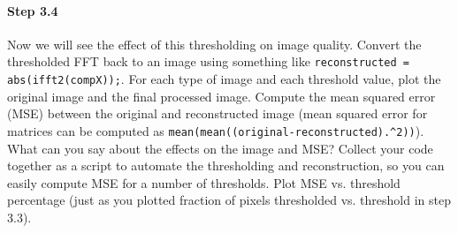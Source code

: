 \begin{sloppypar}
\paragraph{Step 3.4} Now we will see the effect of this thresholding
on image quality. Convert the thresholded FFT back to an image using
something like \verb|reconstructed = abs(ifft2(compX));|. For each
type of image and each threshold value, plot the original image and
the final processed image. Compute the mean squared error (MSE)
between the original and reconstructed image (mean squared error for
matrices can be computed as
\verb|mean(mean((original-reconstructed).^2))|).  What can you say
about the effects on the image and MSE?  Collect your code together as
a script to automate the thresholding and reconstruction, so you can
easily compute MSE for a number of thresholds. Plot MSE vs. threshold
percentage (just as you plotted fraction of pixels thresholded
vs. threshold in step 3.3).
\end{sloppypar}

